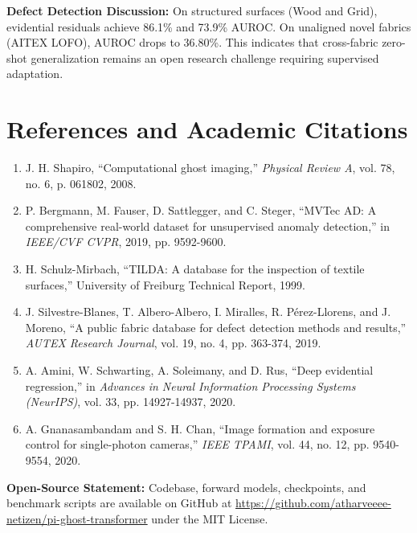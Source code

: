 \documentclass[10pt,a4paper]{article}
\begin{document}
\textbf{Defect Detection Discussion:} On structured surfaces (Wood and Grid), evidential residuals achieve 86.1\% and 73.9\% AUROC. On unaligned novel fabrics (AITEX LOFO), AUROC drops to 36.80\%. This indicates that cross-fabric zero-shot generalization remains an open research challenge requiring supervised adaptation.

\section{References and Academic Citations}
\begin{enumerate}
    \setlength\itemsep{-2pt}
    \item[{[1]}] J. H. Shapiro, ``Computational ghost imaging,'' \textit{Physical Review A}, vol. 78, no. 6, p. 061802, 2008.
    \item[{[2]}] P. Bergmann, M. Fauser, D. Sattlegger, and C. Steger, ``MVTec AD: A comprehensive real-world dataset for unsupervised anomaly detection,'' in \textit{IEEE/CVF CVPR}, 2019, pp. 9592-9600.
    \item[{[3]}] H. Schulz-Mirbach, ``TILDA: A database for the inspection of textile surfaces,'' University of Freiburg Technical Report, 1999.
    \item[{[4]}] J. Silvestre-Blanes, T. Albero-Albero, I. Miralles, R. P{\'e}rez-Llorens, and J. Moreno, ``A public fabric database for defect detection methods and results,'' \textit{AUTEX Research Journal}, vol. 19, no. 4, pp. 363-374, 2019.
    \item[{[5]}] A. Amini, W. Schwarting, A. Soleimany, and D. Rus, ``Deep evidential regression,'' in \textit{Advances in Neural Information Processing Systems (NeurIPS)}, vol. 33, pp. 14927-14937, 2020.
    \item[{[6]}] A. Gnanasambandam and S. H. Chan, ``Image formation and exposure control for single-photon cameras,'' \textit{IEEE TPAMI}, vol. 44, no. 12, pp. 9540-9554, 2020.
\end{enumerate}

\vspace{2pt}
\noindent \textbf{Open-Source Statement:} Codebase, forward models, checkpoints, and benchmark scripts are available on GitHub at \url{https://github.com/atharveeee-netizen/pi-ghost-transformer} under the MIT License.
\end{document}
